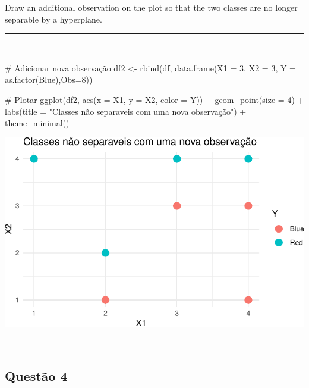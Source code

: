 \documentclass[
  a4paperpaper,
]{article}
\newenvironment{Shaded}{\begin{snugshade}}{\end{snugshade}}
\newcommand{\AttributeTok}[1]{\textcolor[rgb]{0.40,0.45,0.13}{#1}}
\newcommand{\CommentTok}[1]{\textcolor[rgb]{0.37,0.37,0.37}{#1}}
\newcommand{\DecValTok}[1]{\textcolor[rgb]{0.68,0.00,0.00}{#1}}
\newcommand{\FunctionTok}[1]{\textcolor[rgb]{0.28,0.35,0.67}{#1}}
\newcommand{\NormalTok}[1]{\textcolor[rgb]{0.00,0.23,0.31}{#1}}
\newcommand{\OtherTok}[1]{\textcolor[rgb]{0.00,0.23,0.31}{#1}}
\newcommand{\SpecialCharTok}[1]{\textcolor[rgb]{0.37,0.37,0.37}{#1}}
\newcommand{\StringTok}[1]{\textcolor[rgb]{0.13,0.47,0.30}{#1}}
\begin{document}
Draw an additional observation on the plot so that the two classes are
no longer separable by a hyperplane.

\begin{center}\rule{0.5\linewidth}{0.5pt}\end{center}

~

\begin{Shaded}
\begin{Highlighting}[]
\CommentTok{\# Adicionar nova observação}
\NormalTok{df2 }\OtherTok{\textless{}{-}} \FunctionTok{rbind}\NormalTok{(df, }\FunctionTok{data.frame}\NormalTok{(}\AttributeTok{X1 =} \DecValTok{3}\NormalTok{, }\AttributeTok{X2 =} \DecValTok{3}\NormalTok{, }\AttributeTok{Y =} \FunctionTok{as.factor}\NormalTok{(}\StringTok{\textquotesingle{}Blue\textquotesingle{}}\NormalTok{),}\AttributeTok{Obs=}\DecValTok{8}\NormalTok{))}

\CommentTok{\# Plotar}
\FunctionTok{ggplot}\NormalTok{(df2, }\FunctionTok{aes}\NormalTok{(}\AttributeTok{x =}\NormalTok{ X1, }\AttributeTok{y =}\NormalTok{ X2, }\AttributeTok{color =}\NormalTok{ Y)) }\SpecialCharTok{+}
  \FunctionTok{geom\_point}\NormalTok{(}\AttributeTok{size =} \DecValTok{4}\NormalTok{) }\SpecialCharTok{+}
  \FunctionTok{labs}\NormalTok{(}\AttributeTok{title =} \StringTok{"Classes não separaveis com uma nova observação"}\NormalTok{) }\SpecialCharTok{+}
  \FunctionTok{theme\_minimal}\NormalTok{()}
\end{Highlighting}
\end{Shaded}

\includegraphics{lista-5_files/figure-pdf/unnamed-chunk-13-1.pdf}

~

\subsection{Questão 4}\label{questuxe3o-4}
\end{document}
